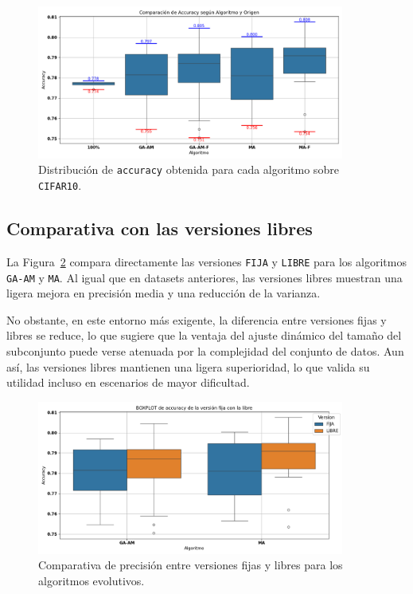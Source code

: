 \begin{figure}[htp]
    \centering
    \includegraphics[width=0.9\textwidth]{imagenes/evaluaciones/cifar10/boxplot-por-algoritmo.png}
    \caption{Distribución de \texttt{accuracy} obtenida para cada algoritmo sobre \texttt{CIFAR10}.}
    \label{fig:cifar10_boxplot}
\end{figure}

\subsection{Comparativa con las versiones libres}

La Figura~\ref{fig:cifar10_fija_vs_libre} compara directamente las versiones \texttt{FIJA} y \texttt{LIBRE} para los algoritmos \texttt{GA-AM} y \texttt{MA}. Al igual que en datasets anteriores, las versiones libres muestran una ligera mejora en precisión media y una reducción de la varianza.

No obstante, en este entorno más exigente, la diferencia entre versiones fijas y libres se reduce, lo que sugiere que la ventaja del ajuste dinámico del tamaño del subconjunto puede verse atenuada por la complejidad del conjunto de datos. Aun así, las versiones libres mantienen una ligera superioridad, lo que valida su utilidad incluso en escenarios de mayor dificultad.

\begin{figure}[htp]
    \centering
    \includegraphics[width=0.9\textwidth]{imagenes/evaluaciones/cifar10/boxplot-libres.png}
    \caption{Comparativa de precisión entre versiones fijas y libres para los algoritmos evolutivos.}
    \label{fig:cifar10_fija_vs_libre}
\end{figure}

